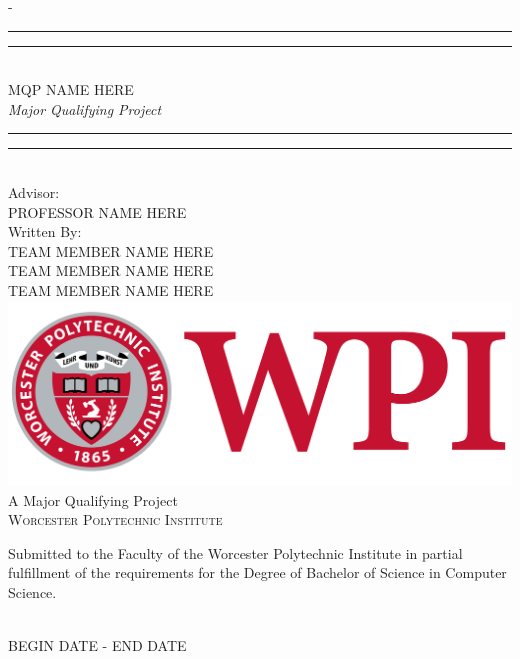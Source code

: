 \begin{titlingpage}
\begin{SingleSpace}
\calccentering{\unitlength} 
\begin{adjustwidth*}{\unitlength}{-\unitlength}
\vspace*{9mm}
\begin{center}
\rule[0.5ex]{\linewidth}{2pt}\vspace*{-\baselineskip}\vspace*{3.2pt}
\rule[0.5ex]{\linewidth}{1pt}\\[\baselineskip]
{\HUGE MQP NAME HERE}\\[4mm]
{\Large \textit{Major Qualifying Project}}\\
\rule[0.5ex]{\linewidth}{1pt}\vspace*{-\baselineskip}\vspace{3.2pt}
\rule[0.5ex]{\linewidth}{2pt}\\
\vspace{6.5mm}
{\large Advisor:}\\
\vspace{6.5mm}
{\large\textsc{PROFESSOR NAME HERE}}\\
\vspace{6.5mm}
{\large Written By:}\\
\vspace{6.5mm}
{\large\textsc{TEAM MEMBER NAME HERE}}\\
{\large\textsc{TEAM MEMBER NAME HERE}}\\
{\large\textsc{TEAM MEMBER NAME HERE}}\\
\vspace{11mm}
\includegraphics[scale=0.075]{logos/newwpilogo.png}\\
\vspace{6mm}
{\large A Major Qualifying Project\\
\textsc{Worcester Polytechnic Institute}}\\
\vspace{11mm}
\begin{minipage}{10cm}
\centering
Submitted to the Faculty of the Worcester Polytechnic Institute in partial fulfillment of the requirements for the Degree of Bachelor of Science in Computer Science.
\end{minipage}\\
\vspace{9mm}
{\large\textsc{BEGIN DATE - END DATE}}
\vspace{12mm}
\end{center}
\begin{flushright}
\end{flushright}
\end{adjustwidth*}
\end{SingleSpace}
\end{titlingpage}